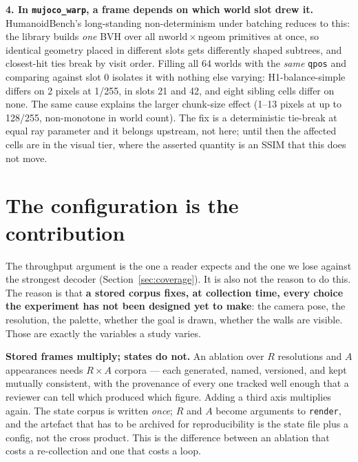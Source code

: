 \documentclass{article}
\begin{document}
\textbf{4. In \texttt{mujoco\_warp}, a frame depends on which world slot drew
it.} HumanoidBench's long-standing non-determinism under batching reduces to
this: the library builds \emph{one} BVH over all
$\mathrm{nworld} \times \mathrm{ngeom}$ primitives at once, so identical
geometry placed in different slots gets differently shaped subtrees, and
closest-hit ties break by visit order. Filling all 64 worlds with the
\emph{same} \texttt{qpos} and comparing against slot 0 isolates it with
nothing else varying: H1-balance-simple differs on 2 pixels at 1/255, in slots
21 and 42, and eight sibling cells differ on none. The same cause explains the
larger chunk-size effect (1--13 pixels at up to 128/255, non-monotone in world
count). The fix is a deterministic tie-break at equal ray parameter and it
belongs upstream, not here; until then the affected cells are in the visual
tier, where the asserted quantity is an SSIM that this does not move.

\section{The configuration is the contribution}
\label{sec:configuration}

The throughput argument is the one a reader expects and the one we lose against
the strongest decoder (Section~\ref{sec:coverage}). It is also not the reason to
do this. The reason is that \textbf{a stored corpus fixes, at collection time,
every choice the experiment has not been designed yet to make}: the camera pose,
the resolution, the palette, whether the goal is drawn, whether the walls are
visible. Those are exactly the variables a study varies.

\textbf{Stored frames multiply; states do not.} An ablation over $R$ resolutions
and $A$ appearances needs $R\!\times\!A$ corpora --- each generated, named,
versioned, and kept mutually consistent, with the provenance of every one
tracked well enough that a reviewer can tell which produced which figure. Adding
a third axis multiplies again. The state corpus is written \emph{once}; $R$ and
$A$ become arguments to \texttt{render}, and the artefact that has to be
archived for reproducibility is the state file plus a config, not the cross
product. This is the difference between an ablation that costs a re-collection
and one that costs a loop.
\end{document}
